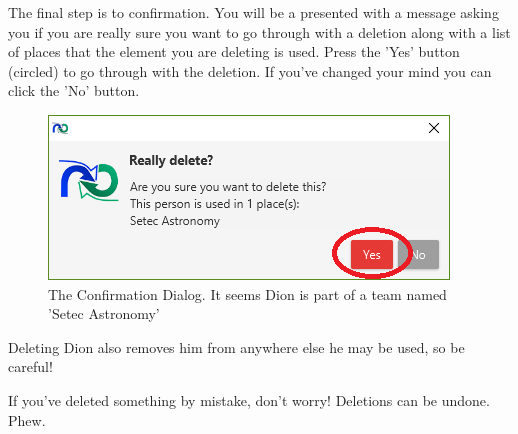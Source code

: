 The final step is to confirmation. You will be a presented with a message asking you if you are really sure you want to go through with a deletion along with a list of places that the element you are deleting is used. Press the 'Yes' button (circled) to go through with the deletion. If you've changed your mind you can click the 'No' button. 

\begin{figure}[H]
\centering
\includegraphics[width=\textwidth]{images/screenshots/deletion3.PNG}
\caption{The Confirmation Dialog. It seems Dion is part of a team named 'Setec Astronomy'}
\label{fig:new_project}
\end{figure}

Deleting Dion also removes him from anywhere else he may be used, so be careful!

If you've deleted something by mistake, don't worry! Deletions can be undone. Phew.